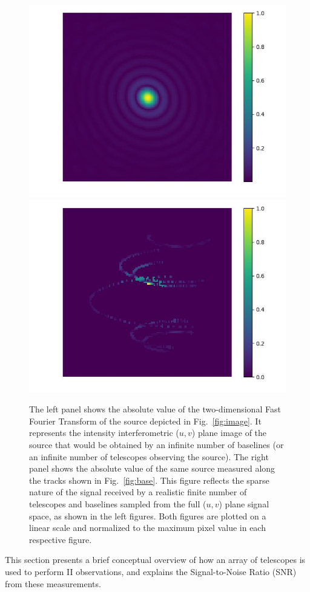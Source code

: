 \begin{figure}
	\includegraphics[width=.49\linewidth]{fig/ft/ft.jpg}\hfil
	\includegraphics[width=.49\linewidth]{fig/ft/ft_base.jpg}
	\caption{The left panel shows the absolute value of the two-dimensional Fast Fourier Transform of the source depicted in Fig.~\ref{fig:image}. It represents the intensity interferometric ($u,v$) plane image of the source that would be obtained by an infinite number of baselines (or an infinite number of telescopes observing the source). The right panel shows the absolute value of the same source measured along the tracks shown in Fig.~\ref{fig:base}. This figure reflects the sparse nature of the signal received by a realistic finite number of telescopes and baselines sampled from the full ($u,v$) plane signal space, as shown in the left figures. Both figures are plotted on a linear scale and normalized to the maximum pixel value in each respective figure.}
	\label{fig:ft}
\end{figure}
This section presents a brief conceptual overview of how an array of telescopes is used to perform II observations, and explains the Signal-to-Noise Ratio (SNR) from these measurements.

